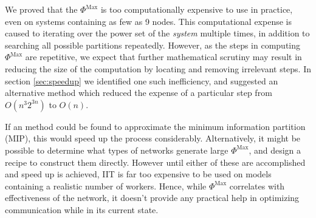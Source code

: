We proved that the $\Phi^\text{Max}$ is too computationally expensive to use in practice, even on systems containing as few as 9 nodes. This computational expense is caused to iterating over the power set of the \textit{system} multiple times, in addition to searching all possible partitions repeatedly. However, as the steps in computing $\Phi^\text{Max}$ are repetitive, we expect that further mathematical scrutiny may result in reducing the size of the computation by locating and removing irrelevant steps. In section \ref{sec:speedup} we identified one such inefficiency, and suggested an alternative method which reduced the expense of a particular step from $O(n^3 2^{3n})$ to $O(n)$. 

If an  method could be found to approximate the minimum information partition (MIP), this would speed up the process considerably. Alternatively, it might be possible to determine what types of networks generate large $\Phi^\text{Max}$, and design a recipe to construct them directly. However until either of these are accomplished and speed up is achieved, IIT is far too expensive to be used on models containing a realistic number of workers. Hence, while $\Phi^\text{Max}$ correlates with effectiveness of the network, it doesn't provide any practical help in optimizing communication while in its current state.


